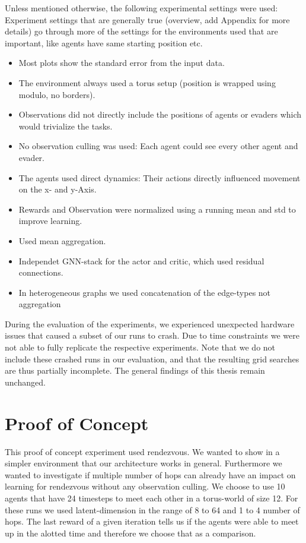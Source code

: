Unless mentioned otherwise, the following experimental settings were used:
Experiment settings that are generally true (overview, add Appendix for more details)
go through more of the settings for the environments used that are important, like agents have same starting position etc.
\begin{itemize}[noitemsep,nolistsep]
    \item Most plots show the standard error from the input data.
    \item The environment always used a torus setup (position is wrapped using modulo, no borders).
    \item Observations did not directly include the positions of agents or evaders which would trivialize the tasks.
    \item No observation culling was used: Each agent could see every other agent and evader.
    \item The agents used direct dynamics: Their actions directly influenced movement on the x- and y-Axis.
    \item Rewards and Observation were normalized using a running mean and std to improve learning.
    \item Used mean aggregation.
    \item Independet GNN-stack for the actor and critic, which used residual connections.
    \item In heterogeneous graphs we used concatenation of the edge-types not aggregation
\end{itemize} \par

During the evaluation of the experiments, we experienced unexpected hardware issues that caused a subset of our runs to crash. Due to time constraints we were not able to fully replicate the respective experiments. Note that we do not include these crashed runs in our evaluation, and that the resulting grid searches are thus partially incomplete. The general findings of this thesis remain unchanged. \par



\section{Proof of Concept}
\label{sec:Proof of Concept}
This proof of concept experiment used rendezvous. We wanted to show in a simpler environment that our architecture works in general. Furthermore we wanted to investigate if multiple number of hops can already have an impact on learning for rendezvous without any observation culling. We choose to use 10 agents that have 24 timesteps to meet each other in a torus-world of size 12. For these runs we used latent-dimension in the range of 8 to 64 and 1 to 4 number of hops. The last reward of a given iteration tells us if the agents were able to meet up in the alotted time and therefore we choose that as a comparison.

